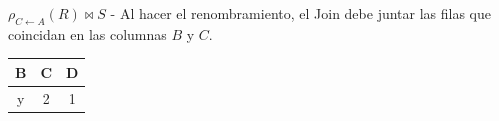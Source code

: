 \item $\rho_{C \leftarrow A} (R) \bowtie S$ - Al hacer el renombramiento, el Join debe juntar las filas que coincidan en las columnas $B$ y $C$.

\begin{center}
\begin{tabular}{ccc}
\toprule
\textbf{B} & \textbf{C} & \textbf{D} \\
\midrule
y & 2 & 1 \\
\bottomrule
\end{tabular}
\end{center}
